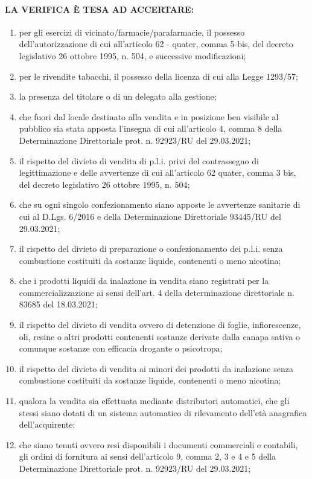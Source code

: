 \documentclass[12pt]{article}
\begin{document}
\paragraph{LA VERIFICA È TESA AD ACCERTARE:}
\begin{enumerate}
    \item per gli esercizi di vicinato/farmacie/parafarmacie, il possesso dell’autorizzazione di cui all’articolo 62 - quater, comma 5-bis, del decreto legislativo 26 ottobre 1995, n. 504, e successive modificazioni;
    \item per le rivendite tabacchi, il possesso della licenza di cui alla Legge 1293/57;
    \item la presenza del titolare o di un delegato alla gestione;
    \item che fuori dal locale destinato alla vendita e in posizione ben visibile al pubblico sia stata apposta l’insegna di cui all’articolo 4, comma 8 della Determinazione Direttoriale prot. n. 92923/RU del 29.03.2021;
    \item il rispetto del divieto di vendita di p.l.i. privi del contrassegno di legittimazione e delle avvertenze di cui all’articolo 62 quater, comma 3 bis, del decreto legislativo 26 ottobre 1995, n. 504;
    \item che su ogni singolo confezionamento siano apposte le avvertenze sanitarie di cui al D.Lgs. 6/2016 e della Determinazione Direttoriale 93445/RU del 29.03.2021;
    \item il rispetto del divieto di preparazione o confezionamento dei p.l.i. senza combustione costituiti da sostanze liquide, contenenti o meno nicotina;
    \item che i prodotti liquidi da inalazione in vendita siano registrati per la commercializzazione ai sensi dell’art. 4 della determinazione direttoriale n. 83685 del 18.03.2021;
    \item il rispetto del divieto di vendita ovvero di detenzione di foglie, infiorescenze, oli, resine o altri prodotti contenenti sostanze derivate dalla canapa sativa o comunque sostanze con efficacia drogante o psicotropa;
    \item il rispetto del divieto di vendita ai minori dei prodotti da inalazione senza combustione costituiti da sostanze liquide, contenenti o meno nicotina;
    \item qualora la vendita sia effettuata mediante distributori automatici, che gli stessi siano dotati di un sistema automatico di rilevamento dell'età anagrafica dell'acquirente;
    \item che siano tenuti ovvero resi disponibili i documenti commerciali e contabili, gli ordini di fornitura ai sensi dell’articolo 9, comma 2, 3 e 4 e 5 della Determinazione Direttoriale prot. n. 92923/RU del 29.03.2021;

\end{enumerate}
\end{document}
